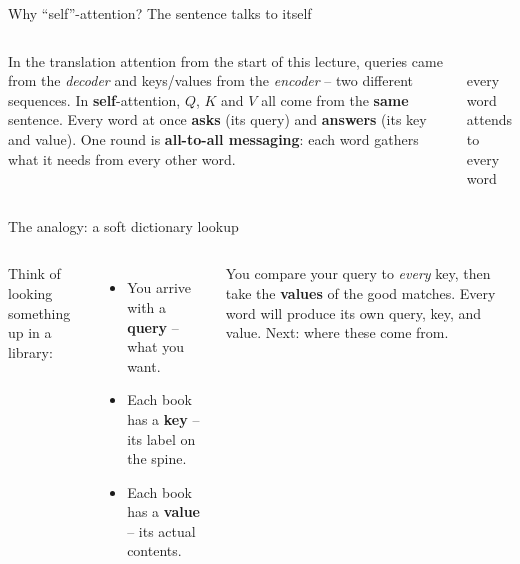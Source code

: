 \documentclass[aspectratio=169]{beamer}
\begin{document}
\begin{frame}{Why ``self''-attention? The sentence talks to itself}
  \begin{columns}[T]
    In the translation attention from the start of this lecture, queries came from the
    \emph{decoder} and keys/values from the \emph{encoder} -- two different sequences.
    \vskip 6pt
    In \textbf{self}-attention, $Q$, $K$ and $V$ all come from the \textbf{same} sentence. Every
    word at once \textbf{asks} (its query) and \textbf{answers} (its key and value). One round is
    \textbf{all-to-all messaging}: each word gathers what it needs from every other word.
    \begin{center}
      \\[4pt]
      {\footnotesize every word attends to every word}
    \end{center}
  \end{columns}
  \vskip 4pt
\end{frame}

\begin{frame}{The analogy: a soft dictionary lookup}
  \begin{columns}[T]
    Think of looking something up in a library:
    \begin{itemize}\small
      \item You arrive with a \textbf{query} -- what you want.
      \item Each book has a \textbf{key} -- its label on the spine.
      \item Each book has a \textbf{value} -- its actual contents.
    \end{itemize}
    \vskip 4pt
    You compare your query to \emph{every} key, then take the \textbf{values} of the good matches.
    \vskip 6pt
    {\small Every word will produce its own query, key, and value. Next: where these come from.}
  \end{columns}
\end{frame}
\end{document}
